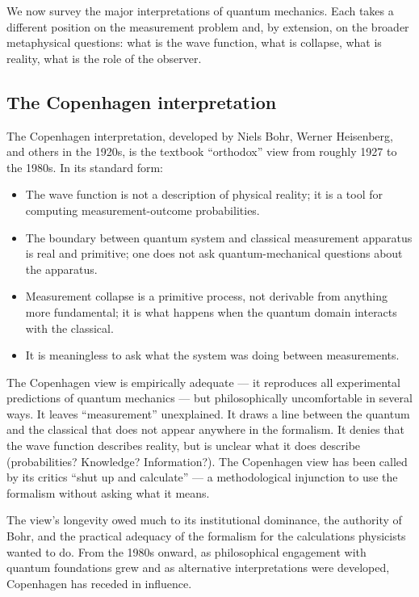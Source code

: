 We now survey the major interpretations of quantum mechanics. Each
takes a different position on the measurement problem and, by
extension, on the broader metaphysical questions: what is the wave
function, what is collapse, what is reality, what is the role of the
observer.

\subsection{The Copenhagen interpretation}

The Copenhagen interpretation, developed by Niels Bohr, Werner
Heisenberg, and others in the 1920s, is the textbook ``orthodox''
view from roughly 1927 to the 1980s. In its standard form:

\begin{itemize}[leftmargin=2em]
    \item The wave function is not a description of physical reality;
    it is a tool for computing measurement-outcome probabilities.
    \item The boundary between quantum system and classical
    measurement apparatus is real and primitive; one does not ask
    quantum-mechanical questions about the apparatus.
    \item Measurement collapse is a primitive process, not derivable
    from anything more fundamental; it is what happens when the
    quantum domain interacts with the classical.
    \item It is meaningless to ask what the system was doing between
    measurements.
\end{itemize}

The Copenhagen view is empirically adequate --- it reproduces all
experimental predictions of quantum mechanics --- but
philosophically uncomfortable in several ways. It leaves
``measurement'' unexplained. It draws a line between the quantum
and the classical that does not appear anywhere in the formalism. It
denies that the wave function describes reality, but is unclear what
it does describe (probabilities? Knowledge? Information?). The
Copenhagen view has been called by its critics ``shut up and
calculate'' --- a methodological injunction to use the formalism
without asking what it means.

The view's longevity owed much to its institutional dominance, the
authority of Bohr, and the practical adequacy of the formalism for
the calculations physicists wanted to do. From the 1980s onward, as
philosophical engagement with quantum foundations grew and as
alternative interpretations were developed, Copenhagen has receded
in influence.

